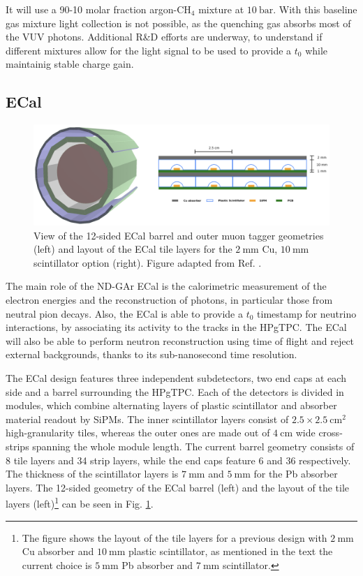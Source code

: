 It will use a 90-10 molar fraction argon-CH$_{4}$ mixture at $10~\mathrm{bar}$. With this baseline gas mixture light collection is not possible, as the quenching gas absorbs most of the VUV photons. Additional R\&D efforts are underway, to understand if different mixtures allow for the light signal to be used to provide a $t_{0}$ while maintainig stable charge gain.

\subsection{ECal}

\begin{figure}[t]
	\centering
	\includegraphics[width=0.99\linewidth]{Images/ND-GAr/ndgar_ecal}
	\caption[Diagram of the ALICE TPC, showing the two drift chambers, inner and outer field cages and readout chambers.]{View of the 12-sided ECal barrel and outer muon tagger geometries (left) and layout of the ECal tile layers for the $2~\mathrm{mm}$ Cu, $10~\mathrm{mm}$ scintillator option (right). Figure adapted from Ref. \cite{DUNE2020TDR1}.}
	\label{fig:ndgar_ecal}
\end{figure}

The main role of the ND-GAr ECal is the calorimetric measurement of the electron energies and the reconstruction of photons, in particular those from neutral pion decays. Also, the ECal is able to provide a $t_{0}$ timestamp for neutrino interactions, by associating its activity to the tracks in the HPgTPC. The ECal will also be able to perform neutron reconstruction using time of flight and reject external backgrounds, thanks to its sub-nanosecond time resolution.

The ECal design features three independent subdetectors, two end caps at each side and a barrel surrounding the HPgTPC. Each of the detectors is divided in modules, which combine alternating layers of plastic scintillator and absorber material readout by SiPMs. The inner scintillator layers consist of $2.5\times2.5~\mathrm{cm}^{2}$ high-granularity tiles, whereas the outer ones are made out of $4~\mathrm{cm}$ wide cross-strips spanning the whole module length. The current barrel geometry consists of 8 tile layers and 34 strip layers, while the end caps feature 6 and 36 respectively. The thickness of the scintillator layers is $7~\mathrm{mm}$ and $5~\mathrm{mm}$ for the Pb absorber layers. The 12-sided geometry of the ECal barrel (left) and the layout of the tile layers (left)\footnote{The figure shows the layout of the tile layers for a previous design with $2~\mathrm{mm}$ Cu absorber and $10~\mathrm{mm}$ plastic scintillator, as mentioned in the text the current choice is $5~\mathrm{mm}$ Pb absorber and $7~\mathrm{mm}$ scintillator.} can be seen in Fig. \ref{fig:ndgar_ecal}.

